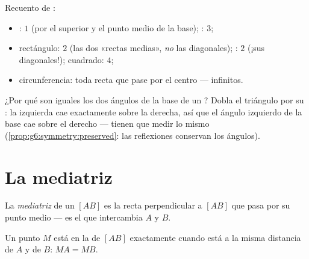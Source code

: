\begin{example}\label{ex:g6:symmetry:shapes}
Recuento de :
\begin{itemize}
  \item {}: $1$ (por el  superior y el punto medio
        de la base); : $3$;
  \item rectángulo: $2$ (las dos «rectas medias», \emph{no} las
        diagonales); : $2$ (¡sus diagonales!); cuadrado: $4$;
  \item circunferencia: toda recta que pase por el centro --- infinitos.
\end{itemize}
\end{example}

\begin{example}\label{ex:g6:symmetry:proves}
¿Por qué son iguales los dos ángulos de la base de un ? Dobla el
triángulo por su : la  izquierda cae exactamente sobre la
 derecha, así que el ángulo izquierdo de la base cae sobre el derecho ---
tienen que medir lo mismo
(\cref{prop:g6:symmetry:preserved}: las reflexiones conservan los ángulos).
\end{example}

\section{La mediatriz}

\begin{definition}[Mediatriz]\label{def:g6:symmetry:bisector}
La \emph{mediatriz} de un
 $[AB]$ es la recta perpendicular a $[AB]$ que pasa por su
punto medio --- es el  que intercambia $A$ y $B$.
\end{definition}

\begin{proposition}[Equidistancia]\label{prop:g6:symmetry:bisector}
Un punto $M$ está en la  de $[AB]$ exactamente cuando está
a la misma distancia de $A$ y de $B$: $MA = MB$.
\end{proposition}
\admitted

